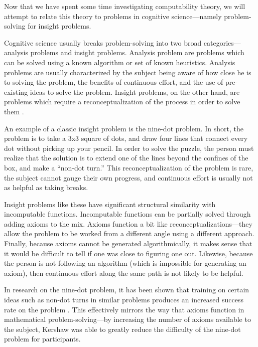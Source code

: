 Now that we have spent some time investigating computability theory, we will attempt to relate this theory to problems in cognitive science---namely problem-solving for insight problems.

Cognitive science usually breaks problem-solving into two broad categories---analysis problems and insight problems.  Analysis problem are problems which can be solved using a known algorithm or set of known heuristics.  Analysis problems are usually characterized by the subject being aware of how close he is to solving the problem, the benefits of continuous effort, and the use of pre-existing ideas to solve the problem.  Insight problems, on the other hand, are problems which require a reconceptualization of the process in order to solve them \citep{chronicleetal2004}. 

An example of a classic insight problem is the nine-dot problem.  In short, the problem is to take a 3x3 square of dots, and draw four lines that connect every dot without picking up your pencil.  In order to solve the puzzle, the person must realize that the solution is to extend one of the lines beyond the confines of the box, and make a ``non-dot turn.''  This reconceptualization of the problem is rare, the subject cannot gauge their own progress, and continuous effort is usually not as helpful as taking breaks.

Insight problems like these have significant structural similarity with incomputable functions.  Incomputable functions can be partially solved through adding axioms to the mix.  Axioms function a bit like reconceptualizations---they allow the problem to be worked from a different angle using a different approach.  Finally, because axioms cannot be generated algorithmically, it makes sense that it would be difficult to tell if one was close to figuring one out.  Likewise, because the person is not following an algorithm (which is impossible for generating an axiom), then continuous effort along the same path is not likely to be helpful.

In research on the nine-dot problem, it has been shown that training on certain ideas such as non-dot turns in similar problems produces an increased success rate on the problem \citep{kershawandohlsson2001, kershaw2004}.  This effectively mirrors the way that axioms function in mathematical problem-solving---by increasing the number of axioms available to the subject, Kershaw was able to greatly reduce the difficulty of the nine-dot problem for participants.

